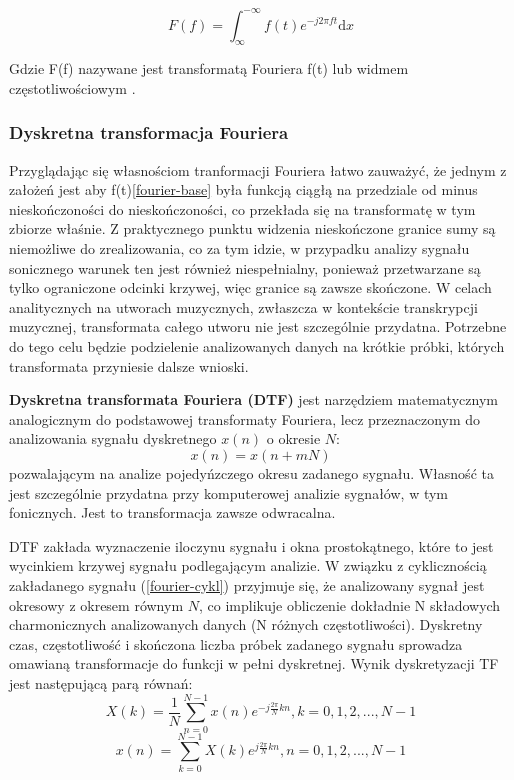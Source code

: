 \documentclass[12pt,a4paper,twoside]{mwart}
\begin{document}
\begin{equation} \label{fourier-base}
F(f) = \int_{\infty}^{-\infty}\textit{f}(t)e^ {-j2\pi ft}\mathrm{d}x
\end{equation}

Gdzie F(f) nazywane jest transformatą Fouriera f(t) lub widmem częstotliwościowym \cite{TransformacjaFourieraWroc}\cite{TransformacjaFourieraAgh}.

\subsubsection{Dyskretna transformacja Fouriera} \label{sec-DTF}

Przyglądając się własnościom tranformacji Fouriera łatwo zauważyć, że jednym z założeń jest aby f(t)\ref{fourier-base} była funkcją ciągłą na przedziale od minus nieskończoności do nieskończoności, co przekłada się na transformatę w tym zbiorze właśnie. Z praktycznego punktu widzenia nieskończone granice sumy są niemożliwe do zrealizowania, co za tym idzie, w przypadku analizy sygnału sonicznego warunek ten jest również niespełnialny, ponieważ przetwarzane są tylko ograniczone odcinki krzywej, więc granice są zawsze skończone. W celach analitycznych na utworach muzycznych, zwłaszcza w kontekście transkrypcji muzycznej, transformata całego utworu nie jest szczególnie przydatna. Potrzebne do tego celu będzie podzielenie analizowanych danych na krótkie próbki, których transformata przyniesie dalsze wnioski.\cite{TransformacjaFourieraWroc}\cite{TransformacjaFourieraelektronikab2b}

\textbf{Dyskretna transformata Fouriera (DTF)} jest narzędziem matematycznym analogicznym do podstawowej transformaty Fouriera, lecz przeznaczonym do analizowania sygnału dyskretnego $x(n)$ o okresie $N$:
\begin{equation} \label{fourier-cykl}
  x(n) = x(n + mN)
\end{equation}
pozwalającym na analize pojedyńzczego okresu zadanego sygnału. Własność ta jest szczególnie przydatna przy komputerowej analizie sygnałów, w tym fonicznych. Jest to transformacja zawsze odwracalna. 

DTF zakłada wyznaczenie iloczynu sygnału i okna prostokątnego, które to jest wycinkiem krzywej sygnału podlegającym analizie. W związku z cyklicznością zakładanego sygnału (\ref{fourier-cykl}) przyjmuje się, że analizowany sygnał jest okresowy z okresem równym $N$, co implikuje obliczenie dokładnie N składowych charmonicznych analizowanych danych (N różnych częstotliwości). Dyskretny czas, częstotliwość i skończona liczba próbek zadanego sygnału sprowadza omawianą transformacje do funkcji w pełni dyskretnej. Wynik dyskretyzacji TF jest następującą parą równań:
\begin{equation} \label{DTF-equation1}
  X(k) = \frac{1}{N}\sum_{n = 0}^{N-1} x(n)e^{-j \frac{2 \pi} {N} kn},  k = 0, 1, 2,..., N-1
\end{equation}
\begin{equation} \label{DTF-equation2}
  x(n) = \sum_{k = 0}^{N-1} X(k)e^{j \frac{2 \pi} {N} kn}, n = 0, 1,  2,...,N-1
\end{equation}
\end{document}
